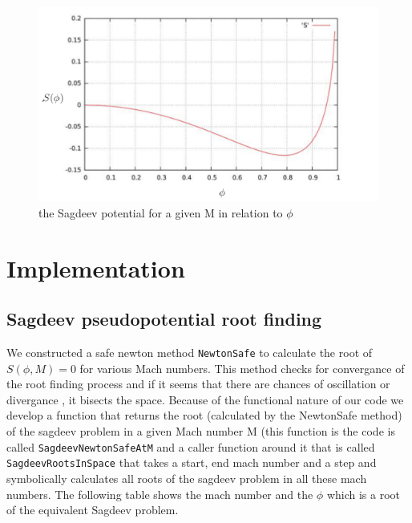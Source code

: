 \documentclass{article}
\begin{document}
\begin{figure}[h]
\begin{center}
\includegraphics[scale=0.7]{phi.png}
\end{center}
\caption{the Sagdeev potential for a given M in relation to $\phi$}
\end{figure}

\section{Implementation}
\subsection{Sagdeev pseudopotential root finding}
We constructed a safe newton method {\tt NewtonSafe} to calculate the root of $S(\phi, M) = 0$
for various Mach numbers. This method checks for convergance of the root finding process and
if it seems that there are chances of oscillation or divergance , it bisects the space.
Because of the functional nature of our code we develop a function that returns the root
(calculated by the NewtonSafe method) of the sagdeev problem in a given Mach number M
(this function is the code is called {\tt SagdeevNewtonSafeAtM} and a caller function around it
that is called {\tt SagdeevRootsInSpace} that takes a start, end mach number and a step and 
symbolically calculates all roots of the sagdeev problem in all these mach numbers. The following
table shows the mach number and the $\phi$ which is a root of the equivalent Sagdeev problem.
\end{document}
